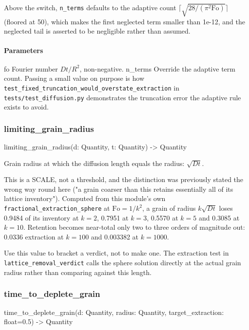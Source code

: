 \documentclass[10pt,a4paper,twoside]{report}
\begin{document}
Above the switch, \texttt{n\_terms} defaults to the adaptive count $\lceil\sqrt{28/(\pi^2 \mathrm{Fo})}\rceil$ (floored at 50), which makes the first neglected term smaller than 1e-12, and the neglected tail is asserted to be negligible rather than assumed.

\paragraph*{Parameters}

fo Fourier number $Dt/R^2$, non-negative. n\_terms Override the adaptive term count. Passing a small value on purpose is how \texttt{test\_fixed\_truncation\_would\_overstate\_extraction} in \texttt{tests/test\_diffusion.py} demonstrates the truncation error the adaptive rule exists to avoid.

\subsubsection*{limiting\_grain\_radius}

\begin{verbatimsmall}
limiting_grain_radius(d: Quantity, t: Quantity) -> Quantity
\end{verbatimsmall}

Grain radius at which the diffusion length equals the radius: $\sqrt{Dt}$.

This is a SCALE, not a threshold, and the distinction was previously stated the wrong way round here ("a grain coarser than this retains essentially all of its lattice inventory"). Computed from this module's own \texttt{fractional\_extraction\_sphere} at $\mathrm{Fo} = 1/k^2$, a grain of radius $k\sqrt{Dt}$ loses 0.9484 of its inventory at $k = 2$, 0.7951 at $k = 3$, 0.5570 at $k = 5$ and 0.3085 at $k = 10$. Retention becomes near-total only two to three orders of magnitude out: 0.0336 extraction at $k = 100$ and 0.003382 at $k = 1000$.

Use this value to bracket a verdict, not to make one. The extraction test in \texttt{lattice\_removal\_verdict} calls the sphere solution directly at the actual grain radius rather than comparing against this length.

\subsubsection*{time\_to\_deplete\_grain}

\begin{verbatimsmall}
time_to_deplete_grain(d: Quantity, radius: Quantity, target_extraction: float=0.5) -> Quantity
\end{verbatimsmall}
\end{document}
